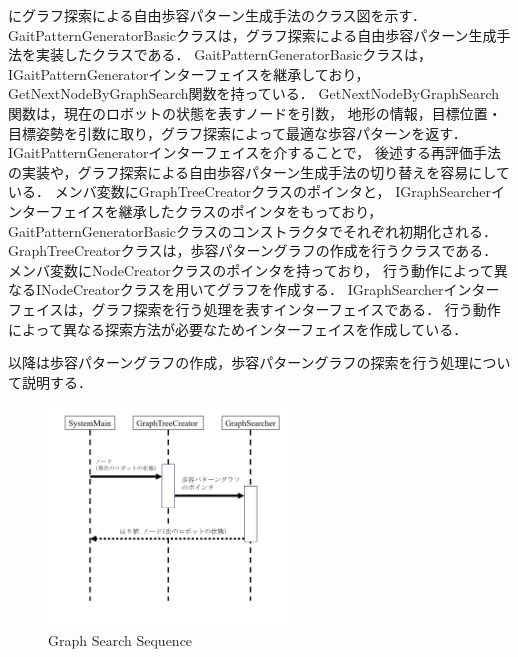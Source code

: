 にグラフ探索による自由歩容パターン生成手法のクラス図を示す．
GaitPatternGeneratorBasicクラスは，グラフ探索による自由歩容パターン生成手法を実装したクラスである．
GaitPatternGeneratorBasicクラスは，IGaitPatternGeneratorインターフェイスを継承しており，
GetNextNodeByGraphSearch関数を持っている．
GetNextNodeByGraphSearch関数は，現在のロボットの状態を表すノードを引数，
地形の情報，目標位置・目標姿勢を引数に取り，グラフ探索によって最適な歩容パターンを返す．
IGaitPatternGeneratorインターフェイスを介することで，
後述する再評価手法の実装や，グラフ探索による自由歩容パターン生成手法の切り替えを容易にしている．
メンバ変数にGraphTreeCreatorクラスのポインタと，
IGraphSearcherインターフェイスを継承したクラスのポインタをもっており，
GaitPatternGeneratorBasicクラスのコンストラクタでそれぞれ初期化される．
GraphTreeCreatorクラスは，歩容パターングラフの作成を行うクラスである．
メンバ変数にNodeCreatorクラスのポインタを持っており，
行う動作によって異なるINodeCreatorクラスを用いてグラフを作成する．
IGraphSearcherインターフェイスは，グラフ探索を行う処理を表すインターフェイスである．
行う動作によって異なる探索方法が必要なためインターフェイスを作成している．

以降は歩容パターングラフの作成，歩容パターングラフの探索を行う処理について説明する．

\begin{figure}[htbp]
  \begin{center}
    \includegraphics[width=65mm, clip]{figure/chapter3/sequence_main.png}
    \caption{Graph Search Sequence}
    \label{fig:graph_search_sequence} %
  \end{center}
\end{figure}

